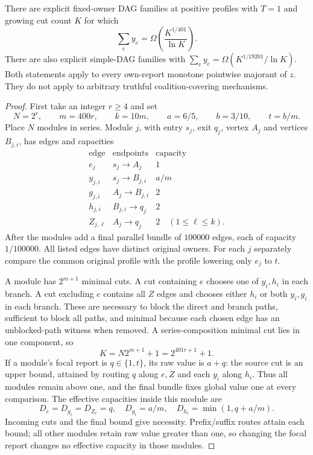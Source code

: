 \begin{theorem}
\label{net:envelope-lower}
There are explicit fixed-owner DAG families at positive profiles with $T=1$
and growing cut count $K$ for which
\[
 \sum_ey_e=\Omega\!\left(\frac{K^{1/401}}{\ln K}\right).
\]
There are also explicit simple-DAG families with
$\sum_ey_e=\Omega(K^{1/19201}/\ln K)$.
Both statements apply to every own-report monotone pointwise majorant of $z$.
They do not apply to arbitrary truthful coalition-covering mechanisms.
\end{theorem}
\begin{proof}
First take an integer $r\ge4$ and set
\[
 N=2^r,\qquad m=400r,\qquad k=10m,\qquad
 a=6/5,\qquad b=3/10,\qquad t=b/m.
\]
Place $N$ modules in series.  Module $j$, with entry $s_j$, exit $q_j$,
vertex $A_j$ and vertices $B_{j,i}$, has edges and capacities
\[
 \begin{array}{c|c|c}
 \text{edge}&\text{endpoints}&\text{capacity}\\\hline
 e_j&s_j\to A_j&1\\
 y_{j,i}&s_j\to B_{j,i}&a/m\\
 g_{j,i}&A_j\to B_{j,i}&2\\
 h_{j,i}&B_{j,i}\to q_j&2\\
 Z_{j,\ell}&A_j\to q_j&2\quad(1\le\ell\le k).
 \end{array}
\]
After the modules add a final parallel bundle of $100000$ edges, each of
capacity $1/100000$.  All listed edges have distinct original owners.
For each $j$ separately compare the common original profile with the profile
lowering only $e_j$ to $t$.

A module has $2^{m+1}$ minimal cuts.  A cut containing $e$ chooses one of
$y_i,h_i$ in each branch.  A cut excluding $e$ contains all $Z$ edges and
chooses either $h_i$ or both $y_i,g_i$ in each branch.
These are necessary to block the direct and branch paths, sufficient to block
all paths, and minimal because each chosen edge has an unblocked-path witness
when removed.  A series-composition minimal cut lies in one component, so
\begin{equation}\label{net:aggregate-K}
 K=N2^{m+1}+1=2^{401r+1}+1.
\end{equation}
If a module's focal report is $q\in\{1,t\}$, its raw value is $a+q$:
the source cut is an upper bound, attained by routing $q$ along $e,Z$ and
each $y_i$ along $h_i$.  Thus all modules remain above one, and the final
bundle fixes global value one at every comparison.
The effective capacities inside this module are
\[
 D_e=D_{g_i}=D_{Z_\ell}=q,\quad D_{y_i}=a/m,\quad
 D_{h_i}=\min(1,q+a/m).
\]
Incoming cuts and the final bound give necessity.  Prefix/suffix routes
attain each bound; all other modules retain raw value greater than one, so
changing the focal report changes no effective capacity in those modules.


\end{proof}
